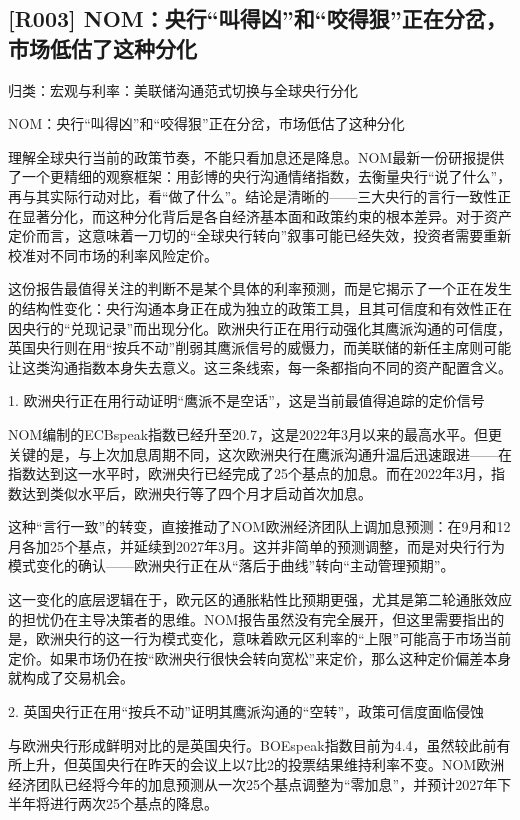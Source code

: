 \documentclass[11pt]{ctexart}
\begin{document}
\subsection{[R003] NOM：央行“叫得凶”和“咬得狠”正在分岔，市场低估了这种分化}
{\small\color{refgray}归类：宏观与利率：美联储沟通范式切换与全球央行分化}

NOM：央行“叫得凶”和“咬得狠”正在分岔，市场低估了这种分化

理解全球央行当前的政策节奏，不能只看加息还是降息。NOM最新一份研报提供了一个更精细的观察框架：用彭博的央行沟通情绪指数，去衡量央行“说了什么”，再与其实际行动对比，看“做了什么”。结论是清晰的——三大央行的言行一致性正在显著分化，而这种分化背后是各自经济基本面和政策约束的根本差异。对于资产定价而言，这意味着一刀切的“全球央行转向”叙事可能已经失效，投资者需要重新校准对不同市场的利率风险定价。

这份报告最值得关注的判断不是某个具体的利率预测，而是它揭示了一个正在发生的结构性变化：央行沟通本身正在成为独立的政策工具，且其可信度和有效性正在因央行的“兑现记录”而出现分化。欧洲央行正在用行动强化其鹰派沟通的可信度，英国央行则在用“按兵不动”削弱其鹰派信号的威慑力，而美联储的新任主席则可能让这类沟通指数本身失去意义。这三条线索，每一条都指向不同的资产配置含义。

1. 欧洲央行正在用行动证明“鹰派不是空话”，这是当前最值得追踪的定价信号

NOM编制的ECBspeak指数已经升至20.7，这是2022年3月以来的最高水平。但更关键的是，与上次加息周期不同，这次欧洲央行在鹰派沟通升温后迅速跟进——在指数达到这一水平时，欧洲央行已经完成了25个基点的加息。而在2022年3月，指数达到类似水平后，欧洲央行等了四个月才启动首次加息。

这种“言行一致”的转变，直接推动了NOM欧洲经济团队上调加息预测：在9月和12月各加25个基点，并延续到2027年3月。这并非简单的预测调整，而是对央行行为模式变化的确认——欧洲央行正在从“落后于曲线”转向“主动管理预期”。

这一变化的底层逻辑在于，欧元区的通胀粘性比预期更强，尤其是第二轮通胀效应的担忧仍在主导决策者的思维。NOM报告虽然没有完全展开，但这里需要指出的是，欧洲央行的这一行为模式变化，意味着欧元区利率的“上限”可能高于市场当前定价。如果市场仍在按“欧洲央行很快会转向宽松”来定价，那么这种定价偏差本身就构成了交易机会。

2. 英国央行正在用“按兵不动”证明其鹰派沟通的“空转”，政策可信度面临侵蚀

与欧洲央行形成鲜明对比的是英国央行。BOEspeak指数目前为4.4，虽然较此前有所上升，但英国央行在昨天的会议上以7比2的投票结果维持利率不变。NOM欧洲经济团队已经将今年的加息预测从一次25个基点调整为“零加息”，并预计2027年下半年将进行两次25个基点的降息。
\end{document}
